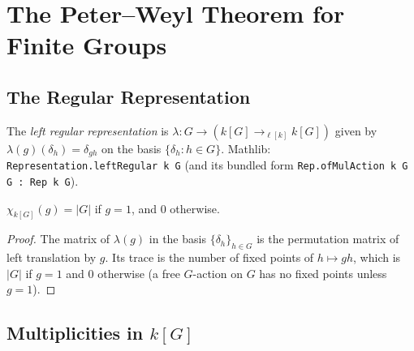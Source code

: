 \chapter{The Peter–Weyl Theorem for Finite Groups}
\label{chap:peter-weyl}

\section{The Regular Representation}

\begin{definition}
  \label{def:regular}
  \mathlibok
  The \emph{left regular representation} is
  $\lambda : G \to (k[G] \to_{\!\ell[k]} k[G])$ given by
  $\lambda(g)(\delta_h) = \delta_{gh}$ on the basis $\{\delta_h : h \in G\}$.
  Mathlib: \texttt{Representation.leftRegular k G} (and its bundled form
  \texttt{Rep.ofMulAction k G G : Rep k G}).
\end{definition}

\begin{lemma}
  \label{lem:char-regular}
  $\chi_{k[G]}(g) = |G|$ if $g = 1$, and $0$ otherwise.
\end{lemma}

\begin{proof}
  The matrix of $\lambda(g)$ in the basis $\{\delta_h\}_{h \in G}$ is the
  permutation matrix of left translation by $g$. Its trace is the number of
  fixed points of $h \mapsto gh$, which is $|G|$ if $g = 1$ and $0$ otherwise
  (a free $G$-action on $G$ has no fixed points unless $g = 1$).
\end{proof}

\section{Multiplicities in $k[G]$}

